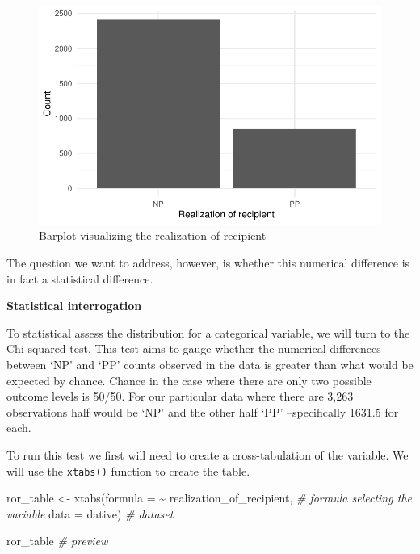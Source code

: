 \documentclass[
  letterpaper,
]{scrbook}
\newenvironment{Shaded}{\begin{snugshade}}{\end{snugshade}}
\newcommand{\AttributeTok}[1]{\textcolor[rgb]{0.00,0.00,0.00}{#1}}
\newcommand{\CommentTok}[1]{\textcolor[rgb]{0.00,0.00,0.00}{\textit{#1}}}
\newcommand{\FunctionTok}[1]{\textcolor[rgb]{0.00,0.00,0.00}{#1}}
\newcommand{\NormalTok}[1]{\textcolor[rgb]{0.00,0.00,0.00}{#1}}
\newcommand{\OtherTok}[1]{\textcolor[rgb]{0.00,0.00,0.00}{#1}}
\newcommand{\SpecialCharTok}[1]{\textcolor[rgb]{0.00,0.00,0.00}{#1}}
\begin{document}
\begin{figure}[h]

{\centering \includegraphics{./inference_files/figure-pdf/figi-uni-cat-visual-dative-1.pdf}

}

\caption{Barplot visualizing the realization of recipient}

\end{figure}

The question we want to address, however, is whether this numerical
difference is in fact a statistical difference.

\textbf{Statistical interrogation}

To statistical assess the distribution for a categorical variable, we
will turn to the Chi-squared test. This test aims to gauge whether the
numerical differences between `NP' and `PP' counts observed in the data
is greater than what would be expected by chance. Chance in the case
where there are only two possible outcome levels is 50/50. For our
particular data where there are 3,263 observations half would be `NP'
and the other half `PP' --specifically 1631.5 for each.

To run this test we first will need to create a cross-tabulation of the
variable. We will use the \texttt{xtabs()} function to create the table.

\begin{Shaded}
\begin{Highlighting}[]
\NormalTok{ror\_table }\OtherTok{\textless{}{-}} 
  \FunctionTok{xtabs}\NormalTok{(}\AttributeTok{formula =} \SpecialCharTok{\textasciitilde{}}\NormalTok{ realization\_of\_recipient, }\CommentTok{\# formula selecting the variable}
        \AttributeTok{data =}\NormalTok{ dative) }\CommentTok{\# dataset}

\NormalTok{ror\_table }\CommentTok{\# preview}
\end{Highlighting}
\end{Shaded}
\end{document}
